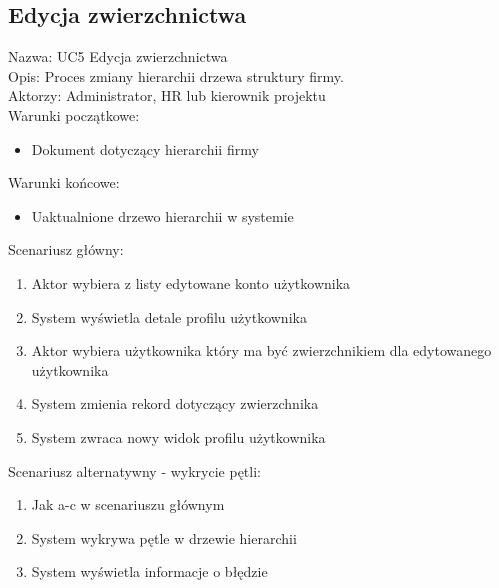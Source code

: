 \subsection{Edycja zwierzchnictwa}
Nazwa: UC5 Edycja zwierzchnictwa \\
Opis: Proces zmiany hierarchii drzewa struktury firmy. \\
Aktorzy: Administrator, HR lub kierownik projektu \\
Warunki początkowe:
\begin{itemize}
\item Dokument dotyczący hierarchii firmy
\end{itemize}
Warunki końcowe:
\begin{itemize}
\item Uaktualnione drzewo hierarchii w systemie 
\end{itemize}
Scenariusz główny:
\begin{enumerate}
\item Aktor wybiera z listy edytowane konto użytkownika
\item System wyświetla detale profilu użytkownika
\item Aktor wybiera użytkownika który ma być zwierzchnikiem dla edytowanego użytkownika
\item System zmienia rekord dotyczący zwierzchnika
\item System zwraca nowy widok profilu użytkownika
\end{enumerate}
Scenariusz alternatywny - wykrycie pętli: 
\begin{enumerate}
\item Jak a-c w scenariuszu głównym
\item System wykrywa pętle w drzewie hierarchii
\item System wyświetla informacje o błędzie
\end{enumerate}

